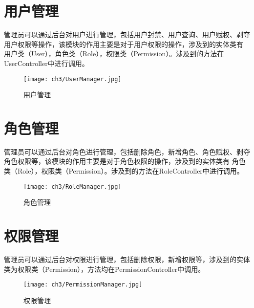 \section{用户管理}
管理员可以通过后台对用户进行管理，包括用户封禁、用户查询、用户赋权、剥夺用户权限等操作，该模块的作用主要是对于用户权限的操作，涉及到的实体类有
用户类（User），角色类（Role），权限类（Permission）。涉及到的方法在UserController中进行调用。
\begin{figure}[htbp]
    \centering
    \texttt{[image: ch3/UserManager.jpg]}
    \caption{用户管理}\label{fig:UserManager}
    \vspace{\baselineskip} %
\end{figure}
\section{角色管理}
管理员可以通过后台对角色进行管理，包括删除角色，新增角色、角色赋权、剥夺角色权限等，该模块的作用主要是对于角色权限的操作，涉及到的实体类有
角色类（Role），权限类（Permission）。涉及到的方法在RoleController中进行调用。
\begin{figure}[htbp]
    \centering
    \texttt{[image: ch3/RoleManager.jpg]}
    \caption{角色管理}\label{fig:RoleManager}
    \vspace{\baselineskip} %
\end{figure}
\section{权限管理}
管理员可以通过后台对权限进行管理，包括删除权限，新增权限等，涉及到的实体类为权限类（Permission），方法均在PermissionController中调用。
\begin{figure}[htbp]
    \centering
    \texttt{[image: ch3/PermissionManager.jpg]}
    \caption{权限管理}\label{fig:PermissionManager}
    \vspace{\baselineskip} %
\end{figure}

